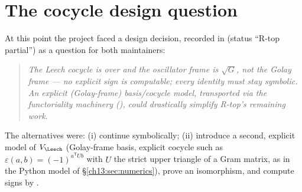 \section{The cocycle design question}\label{ch13:sec:design}

At this point the project faced a design decision, recorded in 
(status ``R-top partial'') as a question for both
maintainers:
\begin{quote}
\emph{The Leech cocycle is  over  and the oscillator
frame is $\sqrt G$, not the Golay frame --- no explicit sign is computable; every identity must stay
symbolic. An explicit (Golay-frame) basis/cocycle model, transported via the functoriality machinery
(), could drastically simplify R-top's remaining work.}
\end{quote}
The alternatives were: (i) continue symbolically; (ii) introduce a second, explicit model of $V_\Leech$
(Golay-frame basis, explicit cocycle such as $\varepsilon(a,b)=(-1)^{a^{\mathsf T}Ub}$ with $U$ the strict upper
triangle of a Gram matrix, as in the Python model of \S\ref{ch13:sec:numerics}), prove an isomorphism,
and compute signs by .


